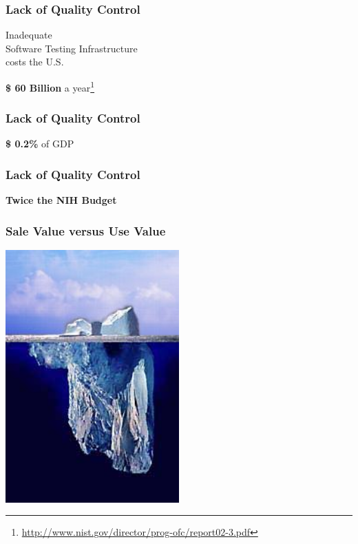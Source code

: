\documentclass[18pt]{beamer}
\begin{document}
{
\begin{frame}
\frametitle{Lack of Quality Control}
\center
\Huge
Inadequate\\
Software Testing Infrastructure\\
costs the U.S.
\pause
\Huge
\bigskip
\begin{center}
\textbf{\$ 60 Billion} a year\footnote{\url{http://www.nist.gov/director/prog-ofc/report02-3.pdf}}
\end{center}
\end{frame}
}


{
\begin{frame}
\frametitle{Lack of Quality Control}
\Huge
\begin{center}
\textbf{\$ 0.2\%} of GDP
\end{center}
\end{frame}
}


{
\begin{frame}
\frametitle{Lack of Quality Control}
\Huge
\begin{center}
\textbf{Twice the NIH Budget}
\end{center}
\end{frame}
}



\begin{frame}[plain]
\frametitle{Sale Value versus Use Value}
  \includegraphics[width=0.5\textwidth,height=\paperheight]{../Art/Iceberg.jpg}
\end{frame}
\end{document}
